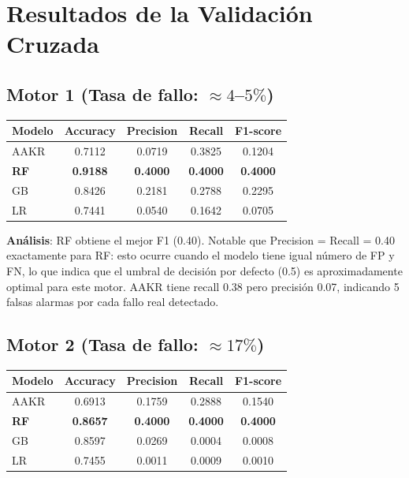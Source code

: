 \documentclass[12pt,a4paper]{article}
\begin{document}
\section{Resultados de la Validaci\'{o}n Cruzada}

\subsection{Motor 1 (Tasa de fallo: $\approx 4$--$5\%$)}

\begin{center}
\begin{tabular}{lcccc}
\toprule
\textbf{Modelo} & \textbf{Accuracy} & \textbf{Precision} & \textbf{Recall} & \textbf{F1-score} \\
\midrule
AAKR & 0.7112 & 0.0719 & 0.3825 & 0.1204 \\
\textbf{RF}   & \textbf{0.9188} & \textbf{0.4000} & \textbf{0.4000} & \textbf{0.4000} \\
GB   & 0.8426 & 0.2181 & 0.2788 & 0.2295 \\
LR   & 0.7441 & 0.0540 & 0.1642 & 0.0705 \\
\bottomrule
\end{tabular}
\end{center}

\textbf{An\'{a}lisis}: RF obtiene el mejor F1 (0.40). Notable que Precision = Recall = 0.40
exactamente para RF: esto ocurre cuando el modelo tiene igual n\'{u}mero de FP y FN,
lo que indica que el umbral de decisi\'{o}n por defecto (0.5) es aproximadamente optimal
para este motor. AAKR tiene recall 0.38 pero precisi\'{o}n 0.07, indicando 5 falsas
alarmas por cada fallo real detectado.

\subsection{Motor 2 (Tasa de fallo: $\approx 17\%$)}

\begin{center}
\begin{tabular}{lcccc}
\toprule
\textbf{Modelo} & \textbf{Accuracy} & \textbf{Precision} & \textbf{Recall} & \textbf{F1-score} \\
\midrule
AAKR & 0.6913 & 0.1759 & 0.2888 & 0.1540 \\
\textbf{RF}   & \textbf{0.8657} & \textbf{0.4000} & \textbf{0.4000} & \textbf{0.4000} \\
GB   & 0.8597 & 0.0269 & 0.0004 & 0.0008 \\
LR   & 0.7455 & 0.0011 & 0.0009 & 0.0010 \\
\bottomrule
\end{tabular}
\end{center}
\end{document}
